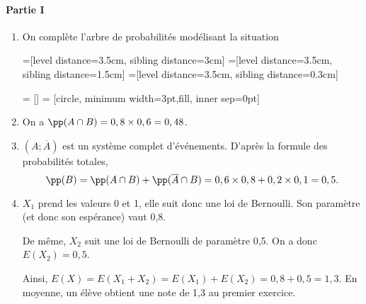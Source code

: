 \documentclass[11pt,fleqn, openany]{book} %
\begin{document}
\begin{solution}
\paragraph{Partie I}

\begin{enumerate}
\item On complète l'arbre de probabilités modélisant la situation

=[level distance=3.5cm, sibling distance=3cm]
=[level distance=3.5cm, sibling distance=1.5cm]
=[level distance=3.5cm, sibling distance=0.3cm]

 = []
 = [circle, minimum width=3pt,fill, inner sep=0pt]


\begin{center}
\end{center}

\item On a $\pp(A \cap B)= 0,8 \times 0,6=0,48$.

\item $(A;\overline{A})$ est un système complet d'événements. D'après la formule des probabilités totales,
\[ \pp(B)=\pp(A \cap B)+\pp(\overline{A} \cap B)=0,6 \times 0,8 +0,2 \times 0,1=0,5.\]
\item $X_1$ prend les valeurs 0 et 1, elle suit donc une loi de Bernoulli. Son paramètre (et donc son espérance) vaut 0,8.

De même, $X_2$ suit une loi de Bernoulli de paramètre 0,5. On a donc $E(X_2)=0,5$.

Ainsi, $E(X)=E(X_1+X_2)=E(X_1)+E(X_2)=0,8+0,5=1,3$. En moyenne, un élève obtient une note de 1,3 au premier exercice.


\end{enumerate}
\end{solution}
\end{document}
